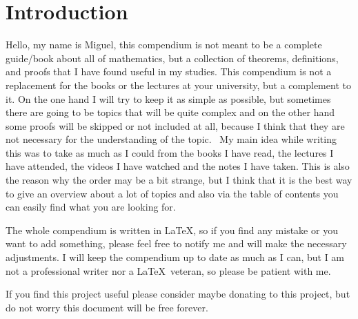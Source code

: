 \newpage
\section{Introduction}

Hello, my name is Miguel, this compendium is not meant to be a complete 
guide/book about all of mathematics,
but a collection of theorems, definitions, and proofs that I have found useful in my studies.
This compendium is not a replacement for the books or the lectures at your university, but a complement to it.
On the one hand I will try to keep it as simple as possible, but sometimes there are going to be topics 
that will be quite 
complex and on the other hand some proofs will be 
skipped or not included at all, because I think that they 
are not necessary for the understanding of the topic.
\vspace{\baselineskip}
\
My main idea while writing this was to take as much as I could from the books I have read, the lectures 
I have attended, the videos I have watched 
and the notes I have taken. This is also the reason why the order may be a bit strange, 
but I think that it is the best way to give an overview about a lot of topics and also 
via the table of contents you can
easily find what you are looking for.
\vspace{\baselineskip}

The whole compendium is written in \LaTeX, so if you find any mistake or you want to add something, please 
feel free to notify me and will make the necessary adjustments.
I will keep the compendium up to date as much as 
I can, but I am not a professional writer nor a \LaTeX\ veteran, so please be patient with me.
\vspace{\baselineskip}

If you find this project useful please consider maybe donating
to this project, but do not worry this document will be free forever.
